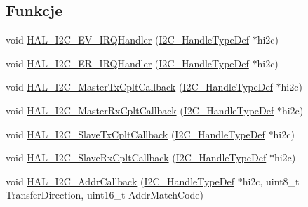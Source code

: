 \subsection*{Funkcje}
\begin{DoxyCompactItemize}
\item 
void \hyperlink{group___i2_c___i_r_q___handler__and___callbacks_ga0cd3cc56c83b85a65e31c945c854d9d5}{H\+A\+L\+\_\+\+I2\+C\+\_\+\+E\+V\+\_\+\+I\+R\+Q\+Handler} (\hyperlink{group___i2_c__handle___structure__definition_ga68e9f45c2fd2161fb827ccdeabb55ea5}{I2\+C\+\_\+\+Handle\+Type\+Def} $\ast$hi2c)
\item 
void \hyperlink{group___i2_c___i_r_q___handler__and___callbacks_ga78739c0d57d55034a9c8bc39c8ee6bc2}{H\+A\+L\+\_\+\+I2\+C\+\_\+\+E\+R\+\_\+\+I\+R\+Q\+Handler} (\hyperlink{group___i2_c__handle___structure__definition_ga68e9f45c2fd2161fb827ccdeabb55ea5}{I2\+C\+\_\+\+Handle\+Type\+Def} $\ast$hi2c)
\item 
void \hyperlink{group___i2_c___i_r_q___handler__and___callbacks_gaa258e0eb52bbc34002a46dc2db89a84b}{H\+A\+L\+\_\+\+I2\+C\+\_\+\+Master\+Tx\+Cplt\+Callback} (\hyperlink{group___i2_c__handle___structure__definition_ga68e9f45c2fd2161fb827ccdeabb55ea5}{I2\+C\+\_\+\+Handle\+Type\+Def} $\ast$hi2c)
\item 
void \hyperlink{group___i2_c___i_r_q___handler__and___callbacks_ga5782358f977ddf450b203fc075833a1d}{H\+A\+L\+\_\+\+I2\+C\+\_\+\+Master\+Rx\+Cplt\+Callback} (\hyperlink{group___i2_c__handle___structure__definition_ga68e9f45c2fd2161fb827ccdeabb55ea5}{I2\+C\+\_\+\+Handle\+Type\+Def} $\ast$hi2c)
\item 
void \hyperlink{group___i2_c___i_r_q___handler__and___callbacks_ga7e086b3ee67187ea072aec6fb4d52aad}{H\+A\+L\+\_\+\+I2\+C\+\_\+\+Slave\+Tx\+Cplt\+Callback} (\hyperlink{group___i2_c__handle___structure__definition_ga68e9f45c2fd2161fb827ccdeabb55ea5}{I2\+C\+\_\+\+Handle\+Type\+Def} $\ast$hi2c)
\item 
void \hyperlink{group___i2_c___i_r_q___handler__and___callbacks_gae23a5b1ce68867c35093ff2b5931e9a0}{H\+A\+L\+\_\+\+I2\+C\+\_\+\+Slave\+Rx\+Cplt\+Callback} (\hyperlink{group___i2_c__handle___structure__definition_ga68e9f45c2fd2161fb827ccdeabb55ea5}{I2\+C\+\_\+\+Handle\+Type\+Def} $\ast$hi2c)
\item 
void \hyperlink{group___i2_c___i_r_q___handler__and___callbacks_ga3b2a6a0ff585d8e529a73ba7d291c92d}{H\+A\+L\+\_\+\+I2\+C\+\_\+\+Addr\+Callback} (\hyperlink{group___i2_c__handle___structure__definition_ga68e9f45c2fd2161fb827ccdeabb55ea5}{I2\+C\+\_\+\+Handle\+Type\+Def} $\ast$hi2c, uint8\+\_\+t Transfer\+Direction, uint16\+\_\+t Addr\+Match\+Code)

\end{DoxyCompactItemize}
